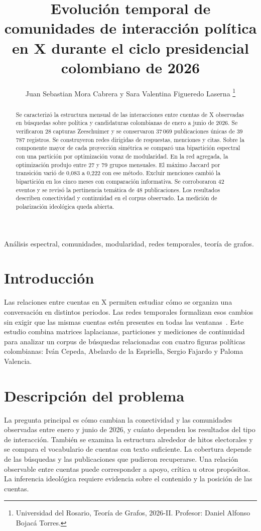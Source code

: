 \documentclass[journal]{IEEEtran}
\title{Evolución temporal de comunidades de interacción política en X durante el ciclo presidencial colombiano de 2026}
\author{Juan Sebastian Mora Cabrera y Sara Valentina Figueredo Laserna%
\thanks{Universidad del Rosario, Teoría de Grafos, 2026-II. Profesor: Daniel Alfonso Bojacá Torres.}}
\begin{document}
\maketitle
\begin{abstract}
Se caracterizó la estructura mensual de las interacciones entre cuentas de X observadas en búsquedas sobre política y candidaturas colombianas de enero a junio de 2026. Se verificaron 28 capturas Zeeschuimer y se conservaron 37\,069 publicaciones únicas de 39\,787 registros. Se construyeron redes dirigidas de respuestas, menciones y citas. Sobre la componente mayor de cada proyección simétrica se comparó una bipartición espectral con una partición por optimización voraz de modularidad. En la red agregada, la optimización produjo entre 27 y 79 grupos mensuales. El máximo Jaccard por transición varió de 0,083 a 0,222 con ese método. Excluir menciones cambió la bipartición en los cinco meses con comparación informativa. Se corroboraron 42 eventos y se revisó la pertinencia temática de 48 publicaciones. Los resultados describen conectividad y continuidad en el corpus observado. La medición de polarización ideológica queda abierta.
\end{abstract}
\begin{IEEEkeywords}
Análisis espectral, comunidades, modularidad, redes temporales, teoría de grafos.
\end{IEEEkeywords}

\section{Introducción}
Las relaciones entre cuentas en X permiten estudiar cómo se organiza una conversación en distintos periodos. Las redes temporales formalizan esos cambios sin exigir que las mismas cuentas estén presentes en todas las ventanas~\cite{holme}. Este estudio combina matrices laplacianas, particiones y mediciones de continuidad para analizar un corpus de búsquedas relacionadas con cuatro figuras políticas colombianas: Iván Cepeda, Abelardo de la Espriella, Sergio Fajardo y Paloma Valencia.

\section{Descripción del problema}
La pregunta principal es cómo cambian la conectividad y las comunidades observadas entre enero y junio de 2026, y cuánto dependen los resultados del tipo de interacción. También se examina la estructura alrededor de hitos electorales y se compara el vocabulario de cuentas con texto suficiente. La cobertura depende de las búsquedas y las publicaciones que pudieron recuperarse. Una relación observable entre cuentas puede corresponder a apoyo, crítica u otros propósitos. La inferencia ideológica requiere evidencia sobre el contenido y la posición de las cuentas.
\end{document}
